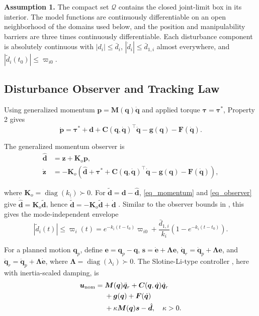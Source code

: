 \noindent\textbf{Assumption 1.} The compact set $\mathcal Q$ contains the closed joint-limit box in its interior. The model functions are continuously differentiable on an open neighborhood of the domains used below, and the position and manipulability barriers are three times continuously differentiable. Each disturbance component is absolutely continuous with $|d_i|\le\bar d_i$, $|\dot d_i|\le\bar d_{1,i}$ almost everywhere, and $|\tilde d_i(t_0)|\le\varpi_{i0}$.

\subsection{Disturbance Observer and Tracking Law}

Using generalized momentum $\bm p=\bm M(\bm q)\dot{\bm q}$ and applied torque $\bm\tau=\bm\tau^*$, Property 2 gives
\begin{equation}
\dot{\bm p}=\bm\tau^*+\bm d+\bm C(\bm q,\dot{\bm q})^\top\dot{\bm q}-\bm g(\bm q)-\bm F(\dot{\bm q}).
\label{eq_momentum}
\end{equation}

The generalized momentum observer \cite{r17} is
\begin{equation}
\begin{aligned}
\hat{\bm d}&=\bm z+\bm K_o\bm p,\\
\dot{\bm z}&=-\bm K_o(\hat{\bm d}+\bm\tau^*
+\bm C(\bm q,\dot{\bm q})^\top\dot{\bm q}-\bm g(\bm q)-\bm F(\dot{\bm q})),
\end{aligned}
\label{eq_observer}
\end{equation}

where $\bm K_o=\operatorname{diag}(k_i)\succ0$. For $\tilde{\bm d}=\bm d-\hat{\bm d}$, \eqref{eq_momentum} and \eqref{eq_observer} give $\dot{\hat{\bm d}}=\bm K_o\tilde{\bm d}$, hence $\dot{\tilde{\bm d}}=-\bm K_o\tilde{\bm d}+\dot{\bm d}$ \cite{r17}. Similar to the observer bounds in \cite{r9,r10}, this gives the mode-independent envelope
\begin{equation}
|\tilde d_i(t)|\le\varpi_i(t)=e^{-k_i(t-t_0)}\varpi_{i0}
+\frac{\bar d_{1,i}}{k_i}(1-e^{-k_i(t-t_0)}).
\label{eq_obs_envelope}
\end{equation}

For a planned motion $\bm q_p$, define $\bm e=\bm q_p-\bm q$, $\bm s=\dot{\bm e}+\bm\Lambda\bm e$, $\dot{\bm q}_r=\dot{\bm q}_p+\bm\Lambda\bm e$, and $\ddot{\bm q}_r=\ddot{\bm q}_p+\bm\Lambda\dot{\bm e}$, where $\bm\Lambda=\operatorname{diag}(\lambda_i)\succ0$. The Slotine-Li-type controller \cite{r18}, here with inertia-scaled damping, is
\begin{equation}
\begin{aligned}
\bm u_{\rm nom}={}&\bm M(\bm q)\ddot{\bm q}_r
+\bm C(\bm q,\dot{\bm q})\dot{\bm q}_r\\
&+\bm g(\bm q)+\bm F(\dot{\bm q})\\
&+\kappa\bm M(\bm q)\bm s-\hat{\bm d},\quad\kappa>0.
\end{aligned}
\label{eq_controller}
\end{equation}

